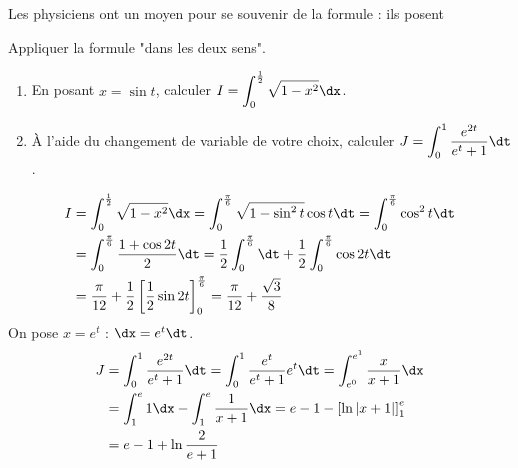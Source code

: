 \documentclass[11pt]{article}
\begin{document}
Les physiciens ont un moyen pour se souvenir de la formule : ils posent 

\begin{ex}{Appliquer la formule "dans les deux sens".}{}
    \begin{enumerate}
        \item En posant $x=\sin t$, calculer $\displaystyle I=\int_0^{\frac{1}{2}}\sqrt{1-x^2}\dx$.
        \item À l'aide du changement de variable de votre choix, calculer $\displaystyle J=\int_0^1\frac{e^{2t}}{e^t+1}\dt$.
    \end{enumerate}
    \begin{align*}
        I&=\int_0^\frac{1}{2}\sqrt{1-x^2}\dx=\int_0^\frac{\pi}{6}\sqrt{1-\sin^2t}\cos t\dt=\int_0^\frac{\pi}{6}\cos^2t\dt\\
        &=\int_0^\frac{\pi}{6}\frac{1+\cos2t}{2}\dt=\frac{1}{2}\int_0^\frac{\pi}{6}\dt+\frac{1}{2}\int_0^\frac{\pi}{6}\cos2t\dt\\
        &=\frac{\pi}{12}+\frac{1}{2}\left[ \frac{1}{2}\sin2t \right]_0^\frac{\pi}{6}=\frac{\pi}{12}+\frac{\sqrt{3}}{8}
    \end{align*}
     On pose $x=e^t$ : $\dx=e^t\dt$.
    \begin{align*}
        J &= \int_0^1\frac{e^{2t}}{e^t+1}\dt=\int_0^1\frac{e^t}{e^t+1}e^t\dt=\int_{e^0}^{e^1}\frac{x}{x+1}\dx\\
        &=\int_1^e1\dx-\int_1^e\frac{1}{x+1}\dx=e-1-\left[ \ln|x+1| \right]_1^e\\
        &=e-1+\ln\frac{2}{e+1}
    \end{align*}
\end{ex}
\end{document}

